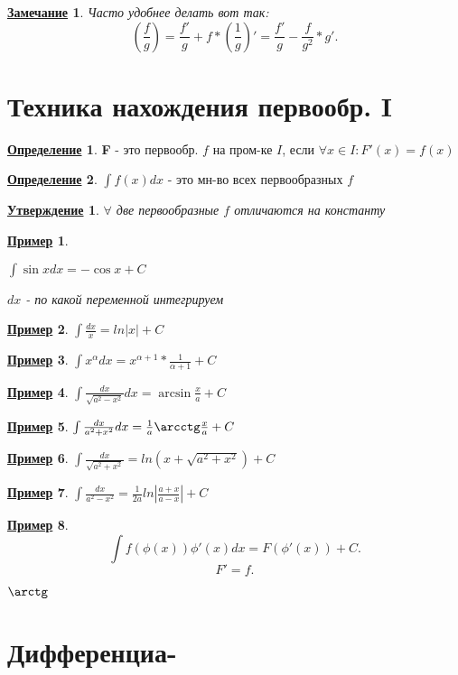 \documentclass[a4, 12pt]{article}
\newtheorem{statement}{\underline{Утверждение}}[section]
\newtheorem*{note}{\underline{Замечание}}
\newtheorem*{example}{\underline{Пример}}
\theoremstyle{definition}
\newtheorem{definition}{\underline{Определение}}[section]
\begin{document}
\begin{note}
Часто удобнее делать вот так:
\[
    (\frac{f}{g}) = \frac{f'}{g} + f * (\frac{1}{g})' = \frac{f'}{g} - \frac{f}{g^{2}} * g'
.\] 
\end{note}
 


\section{Техника нахождения первообр. I}
\begin{definition}
\textbf{F} - это первообр. $f$ на пром-ке $I$, если $\forall x \in I \colon F'(x) = f(x)$
\end{definition}

\begin{definition}
\textbf{$\int f(x)dx$} - это мн-во всех первообразных $f$
\end{definition}

\begin{statement}
$\forall$ две первообразные $f$ отличаются на константу
\end{statement}

\begin{example}
~\newline
    
$\int \sin xdx = -\cos x + C$ 

$dx$ - по какой переменной интегрируем
\end{example}

\begin{example}
$\int \frac{dx}{x} = ln|x| + C $

\end{example}

\begin{example}
$\int x^\alpha dx = x^{\alpha+1} *\frac{1}{\alpha + 1} + C$
\end{example}

\begin{example}
$\int \frac{dx}{\sqrt{a^2 - x^2}} dx = \arcsin \frac{x}{a} + C   $
\end{example}

\begin{example}
$\int \frac{dx}{a^2 + x^2} dx = \frac{1}{a}\arcctg\frac{x}{a} + C $
\end{example}

\begin{example}
$\int \frac{dx}{\sqrt{a^2 + x^2}} = ln(x + \sqrt{a^2 + x^2}) + C$
\end{example}

\begin{example}
$\int \frac{dx}{a^2 - x^2} = \frac{1}{2a}ln|\frac{a + x}{a - x}| + C$
\end{example}

\begin{example}
\[
    \int f(\phi(x))\phi'(x) dx = F(\phi'(x)) + C 
.\] 
\[
    F' = f
.\] 
\end{example}

$\arctg$

\section{Дифференциа-}
\end{document}
